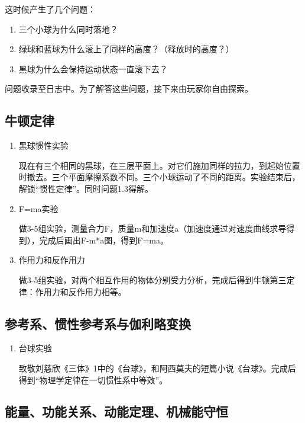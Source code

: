 \documentclass{tstextbook}
\begin{document}
这时候产生了几个问题：

\begin{enumerate}
\item{三个小球为什么同时落地？}
\item{绿球和蓝球为什么滚上了同样的高度？（释放时的高度？）}
\item{黑球为什么会保持运动状态一直滚下去？}
\end{enumerate}

问题收录至日志中。为了解答这些问题，接下来由玩家你自由探索。

\subsection{牛顿定律}

\begin{enumerate}

\item{黑球惯性实验}

现在有三个相同的黑球，在三层平面上。对它们施加同样的拉力，到起始位置时撤去。三个平面摩擦系数不同。三个小球运动了不同的距离。实验结束后，解锁“惯性定律”。同时问题1.3得解。

\item{F=ma实验}

做3-5组实验，测量合力F，质量m和加速度a（加速度通过对速度曲线求导得到），完成后画出F-m*a图，得到F=ma。

\item{作用力和反作用力}

做3-5组实验，对两个相互作用的物体分别受力分析，完成后得到牛顿第三定律：作用力和反作用力相等。

\end{enumerate}

\subsection{参考系、惯性参考系与伽利略变换}

\begin{enumerate}

\item{台球实验}

致敬刘慈欣《三体》1中的《台球》，和阿西莫夫的短篇小说《台球》。完成后得到“物理学定律在一切惯性系中等效”。

\end{enumerate}

\subsection{能量、功能关系、动能定理、机械能守恒}
\end{document}
